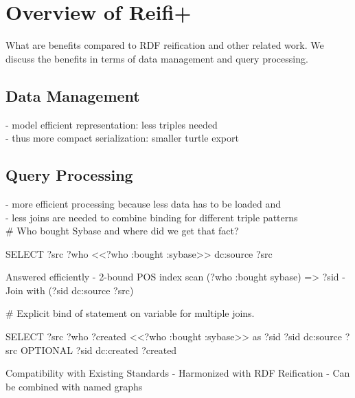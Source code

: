 \section{Overview of Reifi+}
What are benefits compared to RDF reification and other related work. We discuss the benefits in terms of data management and query processing.

\subsection{Data Management}
- model efficient representation: less triples needed\\
- thus more compact serialization: smaller turtle export\\

\subsection{Query Processing}
- more efficient processing because less data has to be loaded and \\
- less joins are needed to combine binding for different triple patterns\\


 \# Who bought Sybase and where did we get that fact?

SELECT ?src ?who {
   <<?who :bought :sybase>> dc:source ?src
}

Answered efficiently
-	2-bound POS index scan (?who :bought sybase) => ?sid
-	Join with (?sid dc:source ?src)

\# Explicit bind of statement on variable for multiple joins.

SELECT ?src ?who ?created {
   <<?who :bought :sybase>> as ?sid
   ?sid dc:source ?src
   OPTIONAL {?sid dc:created ?created}
}

Compatibility with Existing Standards
-	Harmonized with RDF Reification
-	Can be combined with named graphs

